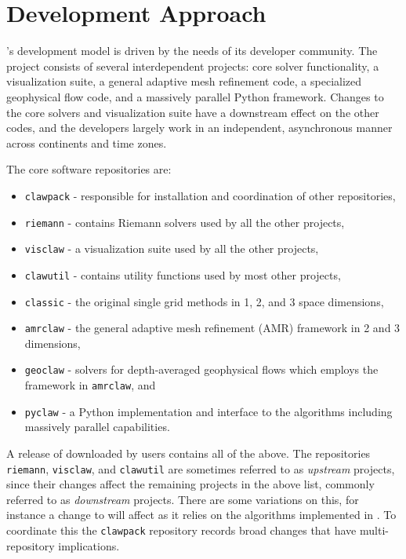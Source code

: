 %
%
%

\section{Development Approach} \label{sec:development}

\clawpack's development model is driven by the needs of its
developer community.  The \clawpack project consists of several
interdependent projects: core solver functionality, a
visualization suite, a general adaptive mesh refinement code, a
specialized geophysical flow code, and a massively parallel Python
framework.  Changes to the core solvers and visualization suite have a
downstream effect on the other codes, and the developers largely work
in an independent, asynchronous manner across continents and time
zones.

\vskip 5pt
The core \clawpack software repositories are:
\begin{itemize}
    \item \texttt{clawpack} - responsible for installation and coordination of
    other repositories,
    \item \texttt{riemann} - contains Riemann solvers used by all the other
    projects,
    \item \texttt{visclaw} - a visualization suite used by all the other
    projects,
    \item \texttt{clawutil} - contains utility functions used by most other
    projects,
    \item \texttt{classic} - the original single grid methods in 1, 2, and 3
    space dimensions,
    \item \texttt{amrclaw} - the general adaptive mesh refinement (AMR)
    framework in 2 and 3 dimensions,
    \item \texttt{geoclaw} - solvers for depth-averaged
    geophysical flows which employs the framework in \texttt{amrclaw}, and
    \item \texttt{pyclaw} - a Python implementation and interface to the
    \clawpack algorithms including massively parallel capabilities.
\end{itemize}

\noindent
A release of \clawpack downloaded by users contains all of the above.
The repositories \texttt{riemann}, \texttt{visclaw}, and
\texttt{clawutil} are sometimes referred to as \textit{upstream} projects, since
their changes
affect the remaining projects in the above list, commonly referred to as 
\textit{downstream} projects.  There are some variations on this, for instance a
change to \amrclaw will affect \geoclaw as it relies on the algorithms
implemented in \amrclaw.  To coordinate this the \texttt{clawpack} repository
records broad changes that have multi-repository implications.


